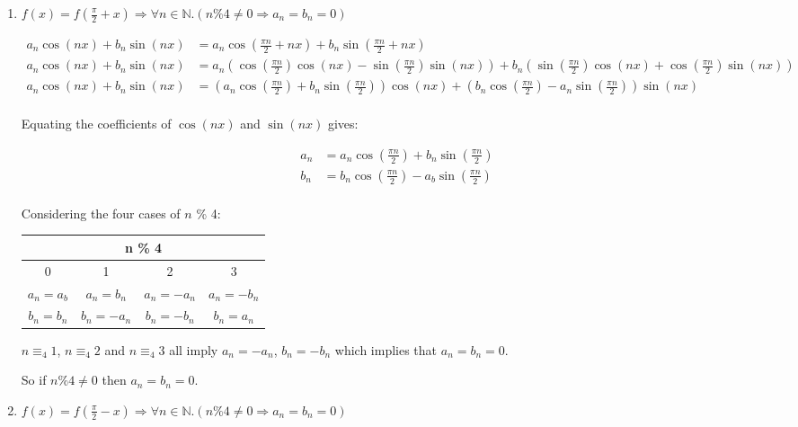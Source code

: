 \documentclass[10pt,\jkfside,a4paper]{article}
\begin{document}
\begin{enumerate}
\begin{enumerate}
So if $n$ is even then $a_n = b_n = 0$.

\item $f(x) = f\left(\frac{\pi}{2} + x\right) \Longrightarrow \forall n \in \mathbb{N}. (n \% 4 \neq 0 \Longrightarrow a_n = b_n = 0)$

\[
\begin{split}
a_n\cos(nx) + b_n\sin(nx) &= a_n\cos\left(\frac{\pi n}{2} + nx\right) + b_n\sin\left(\frac{\pi n}{2} + nx\right) \\
a_n\cos(nx) + b_n\sin(nx) &= a_n\left(\cos\left(\frac{\pi n}{2}\right)\cos(nx) - \sin\left(\frac{\pi n}{2}\right)\sin(nx)\right) + b_n\left(\sin\left(\frac{\pi n}{2}\right)\cos(nx) +  \cos\left(\frac{\pi n}{2}\right)\sin(nx)\right) \\
a_n\cos(nx) + b_n\sin(nx) &= \left(a_n\cos\left(\frac{\pi n}{2}\right) + b_n\sin\left(\frac{\pi n}{2}\right)\right)\cos(nx) + \left(b_n\cos\left(\frac{\pi n}{2}\right) - a_n\sin\left(\frac{\pi n}{2}\right)\right)\sin(nx) \\
\end{split}
\]

Equating the coefficients of $\cos(nx)$ and $\sin(nx)$ gives:

\[
\begin{split}
a_n &= a_n\cos\left(\frac{\pi n}{2}\right) + b_n\sin\left(\frac{\pi n}{2}\right) \\
b_n &= b_n\cos\left(\frac{\pi n}{2}\right) - a_b\sin\left(\frac{\pi n}{2}\right) \\
\end{split}
\]

Considering the four cases of $n$ \% 4:
\begin{center}
\begin{tabular}{c|c|c|c}
\multicolumn{4}{c}{n \% 4} \\
\hline 
0 & 1 & 2 & 3 \\
\hline
$a_n = a_b$ & $a_n = b_n$ & $a_n = -a_n$ & $a_n = -b_n$ \\
$b_n = b_n$ & $b_n = -a_n$ & $b_n = -b_n$ & $b_n = a_n$ \\
\end{tabular}
\end{center}

$n \equiv_4 1$, $n \equiv_4 2$ and $n \equiv_4 3$ all imply $a_n = -a_n$, $b_n = -b_n$ which implies 
that $a_n = b_n = 0$.

So if $n \% 4 \neq 0$ then $a_n = b_n = 0$.

\item \label{pi2minusx} $f(x) = f\left(\frac{\pi}{2} - x\right) \Longrightarrow \forall n \in \mathbb{N}. (n \% 4 \neq 0 \Longrightarrow a_n = b_n = 0)$


\end{enumerate}
\end{enumerate}
\end{document}
